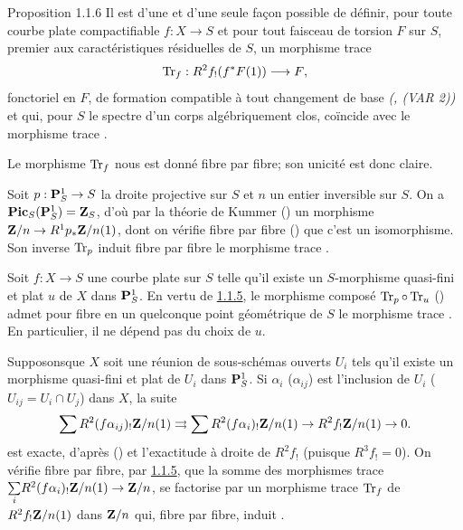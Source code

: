 \documentclass[10pt]{../fichiers-configuration-latex/smfart}
\begin{document}
\begin{enonce*}{Proposition 1.1.6}
Il est d'une et d'une seule façon possible de définir, pour toute
courbe plate compactifiable $f:X\rightarrow S$ et pour tout faisceau
de torsion $F$ sur $S$, premier aux caractéristiques résiduelles de
$S$, un morphisme trace
$$
\operatorname{Tr}_{f}:R^{2}f_{!}(f^{\ast}F(1))\longrightarrow F{},
$$
fonctoriel en $F$, de formation compatible à tout changement de base
\emph{(\cf {}, (VAR 2))} et qui, pour $S$ le spectre d'un
corps algébriquement clos, coïncide avec le morphisme trace
. 
\end{enonce*}

Le morphisme $\operatorname{Tr}_{f}$ nous est donné fibre par fibre; son unicité est
donc claire.

Soit $p:\mathbf{P}^{1}_{S}\rightarrow S$ la droite projective sur $S$ et $n$ un
entier inversible sur $S$. On a
$\operatorname{\mathbf{Pic}}_{S}(\mathbf{P}^{1}_{S})=\mathbf{Z}_{S}$, d'où par la théorie
de Kummer () un morphisme $\mathbf{Z}/n\rightarrow
R^{1}p_{\ast}\mathbf{Z}/n(1)$, dont on vérifie fibre par fibre 
() que c'est un isomorphisme. Son inverse $\operatorname{Tr}_{p}$ induit fibre par
fibre le morphisme trace .

Soit $f:X\rightarrow S$ une courbe plate sur $S$ telle qu'il existe un
$S$-morphisme quasi-fini et plat $u$ de $X$ dans $\mathbf{P}^1_S$. En vertu
de \hyperref[XVIII.lem1.1.5]{1.1.5}, le morphisme composé $\operatorname{Tr}_{p}\circ \operatorname{Tr}_{u}$
() admet pour fibre en un quelconque point
géométrique de $S$ le morphisme trace . En particulier,
il ne dépend pas du choix de $u$.

Supposons\pageoriginale que $X$ soit
une réunion de sous-schémas ouverts $U_{i}$ tels qu'il existe un
morphisme quasi-fini et plat de $U_{i}$ dans $\mathbf{P}^{1}_S$. Si
$\alpha_{i}$ (\resp $\alpha_{ij}$) est l'inclusion de $U_{i}$ (\resp
$U_{ij}=U_{i}\cap U_{j}$) dans $X$, la suite
$$
\sum R^{2}(f\alpha_{ij})_{!}\mathbf{Z}/n(1)\rightrightarrows
\sum R^2(f\alpha_{i})_{!}\mathbf{Z}/n(1)\rightarrow
R^{2}f_{!}\mathbf{Z}/n(1)\rightarrow 0{}.
$$
est exacte, d'après () et l'exactitude à droite de
$R^{2}f_{!}$ (puisque $R^{3}f_{!}=0$). On vérifie fibre par fibre, par
\hyperref[XVIII.lem1.1.5]{1.1.5}, que la somme des morphismes trace
$\underset{i}\sum R^{2}(f\alpha_{i})_{!}\mathbf{Z}/n(1)\rightarrow
\mathbf{Z}/n$, se factorise par un morphisme trace $\operatorname{Tr}_{f}$ de
$R^{2}f_{!}\mathbf{Z}/n(1)$ dans $\mathbf{Z}/n$ qui, fibre par fibre, induit
.
\end{document}
